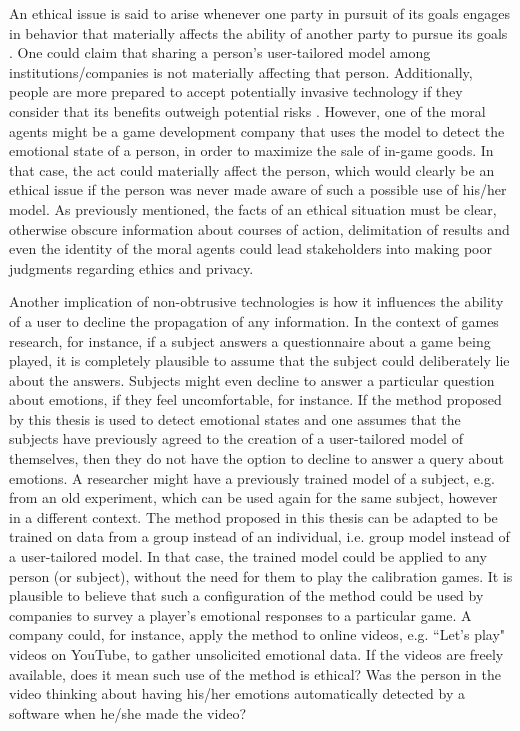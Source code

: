 An ethical issue is said to arise whenever one party in pursuit of its goals engages in behavior that materially affects the ability of another party to pursue its goals \parencite{mason1995applying}. One could claim that sharing a person's user-tailored model among institutions/companies is not materially affecting that person. Additionally, people are more prepared to accept potentially invasive technology if they consider that its benefits outweigh potential risks \parencite{ladd1991computers}. However, one of the moral agents might be a game development company that uses the model to detect the emotional state of a person, in order to maximize the sale of in-game goods. In that case, the act could materially affect the person, which would clearly be an ethical issue if the person was never made aware of such a possible use of his/her model. As previously mentioned, the facts of an ethical situation must be clear, otherwise obscure information about courses of action, delimitation of results and even the identity of the moral agents could lead stakeholders into making poor judgments regarding ethics and privacy.

Another implication of non-obtrusive technologies is how it influences the ability of a user to decline the propagation of any information. In the context of games research, for instance, if a subject answers a questionnaire about a game being played, it is completely plausible to assume that the subject could deliberately lie about the answers. Subjects might even decline to answer a particular question about emotions, if they feel uncomfortable, for instance. If the method proposed by this thesis is used to detect emotional states and one assumes that the subjects have previously agreed to the creation of a user-tailored model of themselves, then they do not have the option to decline to answer a query about emotions. A researcher might have a previously trained model of a subject, e.g. from an old experiment, which can be used again for the same subject, however in a different context. The method proposed in this thesis can be adapted to be trained on data from a group instead of an individual, i.e. group model instead of a user-tailored model. In that case, the trained model could be applied to any person (or subject), without the need for them to play the calibration games. It is plausible to believe that such a configuration of the method could be used by companies to survey a player's emotional responses to a particular game. A company could, for instance, apply the method to online videos, e.g. ``Let's play" videos on YouTube, to gather unsolicited emotional data. If the videos are freely available, does it mean such use of the method is ethical? Was the person in the video thinking about having his/her emotions automatically detected by a software when he/she made the video?

